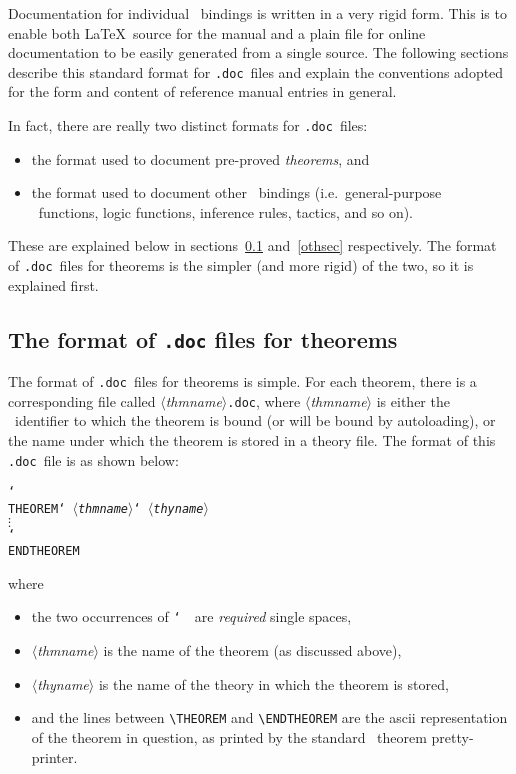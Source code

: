 \documentclass[12pt]{article}
\def\doc{{\tt .doc}}
\def\latex{{\LaTeX}}
\def\vsp{{\tt\char`\ }}
\def\bk{{\tt\char`\\ }}
\def\meta#1{\(\langle\){\it #1}\(\rangle\)}
\begin{document}
Documentation for individual \ML\ bindings is written in a very rigid form.
This is to enable both \latex\ source for the manual and a plain file for
online documentation to be easily generated from a single source. The following
sections describe this standard format for \doc\ files and explain the
conventions adopted for the form and content of reference manual entries in
general.

In fact, there are really two distinct formats for \doc\ files:

\begin{itemize}
\item the format used to document pre-proved {\it theorems\/}, and
\item the format used to document other \ML\ bindings (i.e.\ general-purpose
\ML\ functions, logic functions, inference rules, tactics, and so on).
\end{itemize}

\noindent These are explained below in sections~\ref{thsec} and~\ref{othsec}
respectively.  The format of \doc\ files for theorems is the simpler (and more
rigid) of the two, so it is explained first.

\subsection{The format of {\tt .doc} files for theorems}\label{thsec}

The format of \doc\ files for theorems is simple.  For each theorem, there is
a corresponding file called \meta{thmname}\doc, where \meta{thmname} is either
the \ML\ identifier to which the theorem is bound (or will be bound by
autoloading), or the name under which the theorem is stored in a theory file.
The format of this \doc\ file is as shown below:

\smallskip

\begin{holboxed}\begin{alltt}
\bk{THEOREM}\vsp\meta{thmname}\vsp\meta{thyname}
\(\vdots\)
\bk{ENDTHEOREM}
\end{alltt}\end{holboxed}

\smallskip

\noindent where

\begin{itemize}

\item the two occurrences of \vsp\ are {\it required\/} single spaces,

\item \meta{thmname} is the name of the theorem (as discussed above),

\item \meta{thyname} is the name of the theory in which the theorem is stored,

\item and the lines between {\small\verb!\THEOREM!} and
{\small\verb!\ENDTHEOREM!} are the ascii representation of the theorem in
question, as printed by the standard \HOL\ theorem pretty-printer.

\end{itemize}
\end{document}
